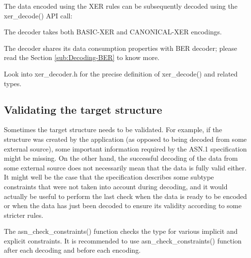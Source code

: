 \documentclass[english,oneside,12pt]{book}
\begin{document}
The data encoded using the XER rules can be subsequently decoded using
the xer\_decode() API call:
The decoder takes both BASIC-XER and CANONICAL-XER encodings.

The decoder shares its data consumption properties with BER decoder;
please read the Section \vref{sub:Decoding-BER} to know more.

Look into xer\_decoder.h for the precise definition of xer\_decode()
and related types.


\subsection{\label{sub:Validating-the-target}Validating the target structure}

Sometimes the target structure needs to be validated. For example,
if the structure was created by the application (as opposed to being
decoded from some external source), some important information required
by the ASN.1 specification might be missing. On the other hand, the
successful decoding of the data from some external source does not
necessarily mean that the data is fully valid either. It might well
be the case that the specification describes some subtype constraints
that were not taken into account during decoding, and it would actually
be useful to perform the last check when the data is ready to be encoded
or when the data has just been decoded to ensure its validity according
to some stricter rules.

The asn\_check\_constraints() function checks the type for various
implicit and explicit constraints. It is recommended to use asn\_check\_constraints()
function after each decoding and before each encoding.
\end{document}
